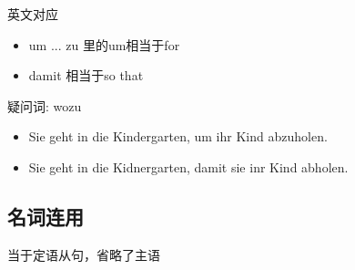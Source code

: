 英文对应
\begin{itemize}
    \item um ... zu 里的um相当于for
    \item damit 相当于so that
\end{itemize}

疑问词: wozu
\begin{itemize}
    \item Sie geht in die Kindergarten, um ihr Kind abzuholen.
    \item Sie geht in die Kidnergarten, damit sie inr Kind abholen.
\end{itemize}

\subsection{名词连用}
当于定语从句，省略了主语